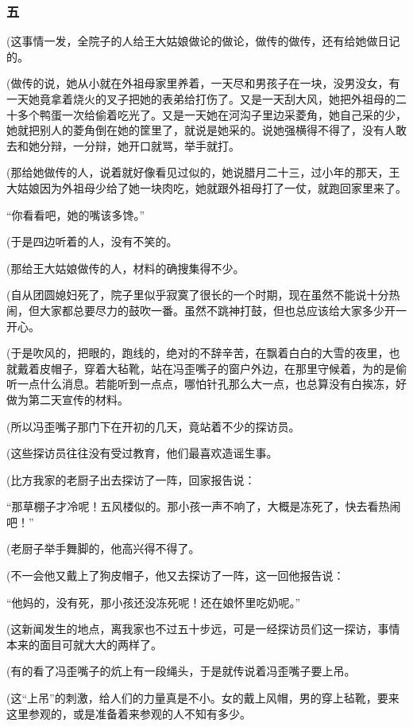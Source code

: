 \subsubsection*{五}
\par (这事情一发，全院子的人给王大姑娘做论的做论，做传的做传，还有给她做日记的。
\par (做传的说，她从小就在外祖母家里养着，一天尽和男孩子在一块，没男没女，有一天她竟拿着烧火的叉子把她的表弟给打伤了。又是一天刮大风，她把外祖母的二十多个鸭蛋一次给偷着吃光了。又是一天她在河沟子里边采菱角，她自己采的少，她就把别人的菱角倒在她的筐里了，就说是她采的。说她强横得不得了，没有人敢去和她分辩，一分辩，她开口就骂，举手就打。
\par (那给她做传的人，说着就好像看见过似的，她说腊月二十三，过小年的那天，王大姑娘因为外祖母少给了她一块肉吃，她就跟外祖母打了一仗，就跑回家里来了。
\par “你看看吧，她的嘴该多馋。”
\par (于是四边听着的人，没有不笑的。
\par (那给王大姑娘做传的人，材料的确搜集得不少。
\par (自从团圆媳妇死了，院子里似乎寂寞了很长的一个时期，现在虽然不能说十分热闹，但大家都总要尽力的鼓吹一番。虽然不跳神打鼓，但也总应该给大家多少开一开心。
\par (于是吹风的，把眼的，跑线的，绝对的不辞辛苦，在飘着白白的大雪的夜里，也就戴着皮帽子，穿着大毡靴，站在冯歪嘴子的窗户外边，在那里守候着，为的是偷听一点什么消息。若能听到一点点，哪怕针孔那么大一点，也总算没有白挨冻，好做为第二天宣传的材料。
\par (所以冯歪嘴子那门下在开初的几天，竟站着不少的探访员。
\par (这些探访员往往没有受过教育，他们最喜欢造谣生事。
\par (比方我家的老厨子出去探访了一阵，回家报告说：
\par “那草棚子才冷呢！五风楼似的。那小孩一声不响了，大概是冻死了，快去看热闹吧！”
\par (老厨子举手舞脚的，他高兴得不得了。
\par (不一会他又戴上了狗皮帽子，他又去探访了一阵，这一回他报告说：
\par “他妈的，没有死，那小孩还没冻死呢！还在娘怀里吃奶呢。”
\par (这新闻发生的地点，离我家也不过五十步远，可是一经探访员们这一探访，事情本来的面目可就大大的两样了。
\par (有的看了冯歪嘴子的炕上有一段绳头，于是就传说着冯歪嘴子要上吊。
\par (这“上吊”的刺激，给人们的力量真是不小。女的戴上风帽，男的穿上毡靴，要来这里参观的，或是准备着来参观的人不知有多少。
